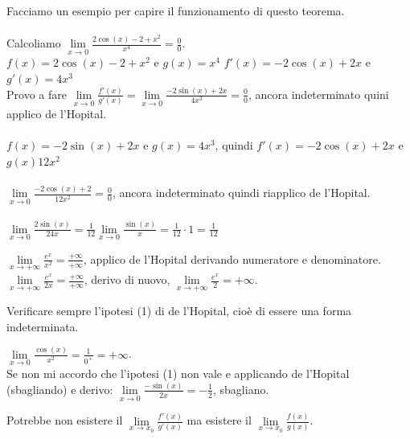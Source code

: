 \begin{example}
Facciamo un esempio per capire il funzionamento di questo teorema.\\\\
Calcoliamo $\lim\limits_{x\to 0}\frac{2\cos(x) - 2 + x^2}{x^4} = \frac{0}{0}$.\\
$f(x) = 2\cos(x) - 2 + x^2$ \: e \: $g(x) = x^4$ \hspace{.5cm} $f'(x) = -2\cos(x) + 2x$ \: e \: $g'(x) = 4x^3$\\
Provo a fare $\lim\limits_{x\to 0}\frac{f'(x)}{g'(x)} = \lim\limits_{x\to 0}\frac{-2\sin(x) + 2x}{4x^3} = \frac{0}{0}$, ancora indeterminato quini applico de l'Hopital. \\\\
$f(x) = -2\sin(x) + 2x$ e $g(x) = 4x^3$, quindi $f'(x) = -2\cos(x) + 2x$ e $g(x) 12x^2$\\\\
$\lim\limits_{x\to 0}\frac{-2\cos(x) + 2}{12x^2} = \frac{0}{0}$, ancora indeterminato quindi riapplico de l'Hopital.\\\\
$\lim\limits_{x\to 0}\frac{2\sin(x)}{24x} = \frac{1}{12}\lim\limits_{x\to 0}\frac{\sin(x)}{x} = \frac{1}{12} \cdot 1 = \frac{1}{12}$\\
\end{example}

\begin{example}
$\lim\limits_{x\to +\infty}\frac{e^x}{x^2} = \frac{+\infty}{+\infty}$, applico de l'Hopital derivando numeratore e denominatore.\\
$\lim\limits_{x\to +\infty}\frac{e^x}{2x} = \frac{+\infty}{+\infty}$, derivo di nuovo, $\lim\limits_{x\to +\infty}\frac{e^x}{2} = +\infty$.
\end{example}

\begin{observation}
Verificare sempre l'ipotesi (1) di de l'Hopital, cioè di essere una forma indeterminata.
\end{observation}

\begin{example}
$\lim\limits_{x\to 0}\frac{\cos(x)}{x^2} = \frac{1}{0^+} = +\infty$.\\
Se non mi accordo che l'ipotesi (1) non vale e applicando de l'Hopital (sbagliando) e derivo: $\lim\limits_{x\to 0}\frac{-\sin(x)}{2x} = -\frac{1}{2}$, sbagliano.
\end{example}

\begin{observation}
Potrebbe non esistere il $\lim\limits_{x\to x_0}\frac{f'(x)}{g'(x)}$ ma esistere il $\lim\limits_{x\to x_0}\frac{f(x)}{g(x)}$.
\end{observation}

